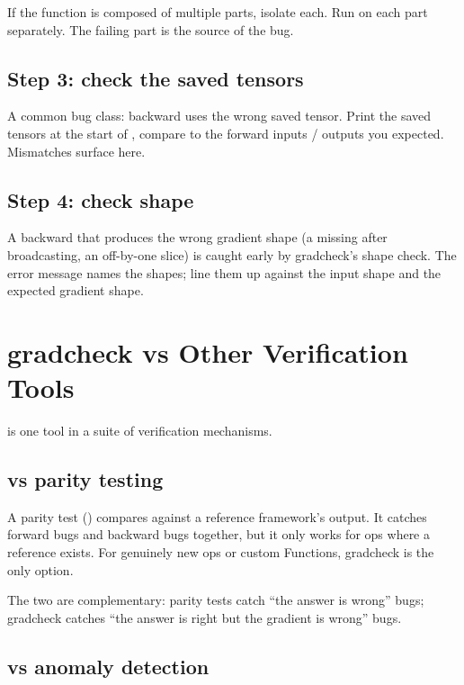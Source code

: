 If the function is composed of multiple parts, isolate each. Run
 on each part separately. The failing part is
the source of the bug.

\subsection{Step 3: check the saved tensors}
\label{ssec:gradcheck:debug_saved}

A common bug class: backward uses the wrong saved tensor. Print
the saved tensors at the start of , compare to the
forward inputs / outputs you expected. Mismatches surface here.

\subsection{Step 4: check shape}
\label{ssec:gradcheck:debug_shape}

A backward that produces the wrong gradient shape (a missing
 after broadcasting, an off-by-one slice) is caught
early by gradcheck's shape check. The error message names the
shapes; line them up against the input shape and the expected
gradient shape.

\section{gradcheck vs Other Verification Tools}
\label{sec:gradcheck:vs_other}

 is one tool in a suite of verification
mechanisms.

\subsection{vs parity testing}
\label{ssec:gradcheck:vs_parity}

A parity test () compares against a reference
framework's output. It catches forward bugs and backward bugs
together, but it only works for ops where a reference exists. For
genuinely new ops or custom Functions, gradcheck is the only
option.

The two are complementary: parity tests catch ``the answer is
wrong'' bugs; gradcheck catches ``the answer is right but the
gradient is wrong'' bugs.

\subsection{vs anomaly detection}
\label{ssec:gradcheck:vs_anomaly}

